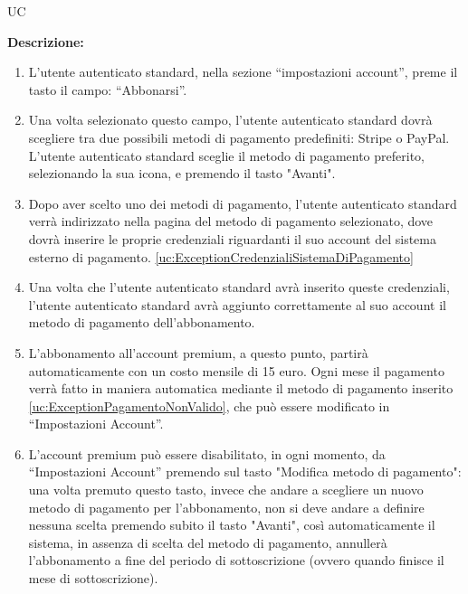 \begin{listaPersonale}{UC}
\begin{listaPersonale2}[UC] {}
        \textbf{Descrizione:}
        \begin{enumerate}
            \item L'utente autenticato standard, nella sezione “impostazioni account”, preme il tasto il campo: “Abbonarsi”.
            \item Una volta selezionato questo campo, l'utente autenticato standard dovrà scegliere tra due possibili metodi di pagamento predefiniti: Stripe o PayPal. L'utente autenticato standard sceglie il metodo di pagamento preferito, selezionando la sua icona, e premendo il tasto "Avanti".
            \item Dopo aver scelto uno dei metodi di pagamento, l'utente autenticato standard verrà indirizzato nella pagina del metodo di pagamento selezionato, dove dovrà inserire le proprie credenziali riguardanti il suo account del sistema esterno di pagamento. \ref{uc:ExceptionCredenzialiSistemaDiPagamento}
            \item Una volta che l'utente autenticato standard avrà inserito queste credenziali, l'utente autenticato standard avrà aggiunto correttamente al suo account il metodo di pagamento dell'abbonamento.
            \item L'abbonamento all'account premium, a questo punto, partirà automaticamente con un costo mensile di 15 euro. Ogni mese il pagamento verrà fatto in maniera automatica mediante il metodo di pagamento inserito \ref{uc:ExceptionPagamentoNonValido}, che può essere modificato in “Impostazioni Account”.
            \item L'account premium può essere disabilitato, in ogni momento, da “Impostazioni Account” premendo sul tasto "Modifica metodo di pagamento": una volta premuto questo tasto, invece che andare a scegliere un nuovo metodo di pagamento per l'abbonamento, non si deve andare a definire nessuna scelta premendo subito il tasto "Avanti", così automaticamente il sistema, in assenza di scelta del metodo di pagamento, annullerà l'abbonamento a fine del periodo di sottoscrizione (ovvero quando finisce il mese di sottoscrizione).
        \end{enumerate}

\end{listaPersonale2}
\end{listaPersonale}
